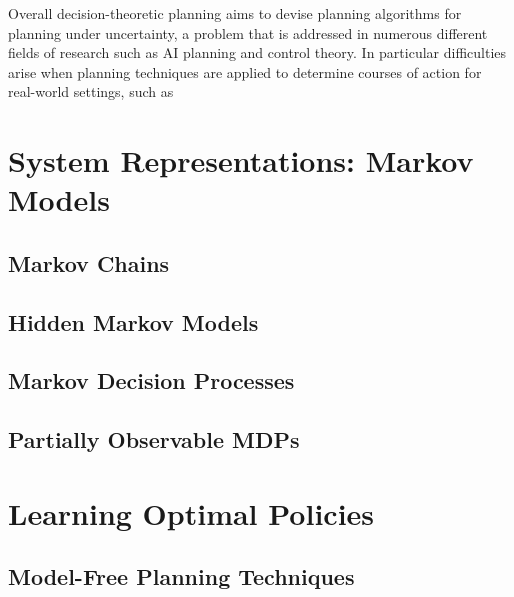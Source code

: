 Overall decision-theoretic planning aims to devise planning algorithms for planning under uncertainty, a problem that is addressed in numerous different fields of research such as AI planning and control theory.
In particular difficulties arise when planning techniques are applied to determine courses of action for real-world settings, such as 

\section{System Representations: Markov Models}
\label{sec:system-representation}

%

\subsection{Markov Chains}
\label{subsec:markov-chains}

%

\subsection{Hidden Markov Models}
\label{subsec:hidden-markov-models}

%

\subsection{Markov Decision Processes}
\label{subsec:mdps}


%

\subsection{Partially Observable MDPs}
\label{subsec:pomdps}


% 

\section{Learning Optimal Policies}
\label{sec:planning}

% 

\subsection{Model-Free Planning Techniques}
\label{subsec:model-free-planning}

